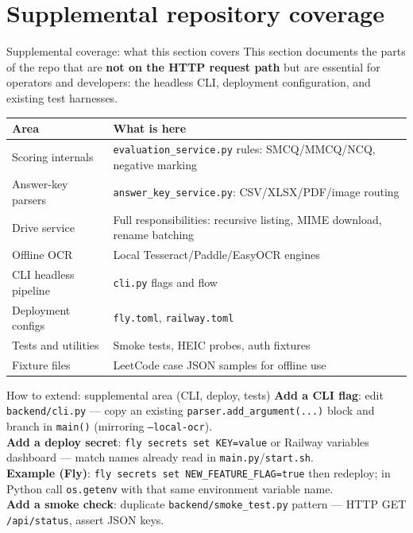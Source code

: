 \documentclass[aspectratio=169]{beamer}
\begin{document}
\section{Supplemental repository coverage}

\begin{frame}{Supplemental coverage: what this section covers}
  \small
  This section documents the parts of the repo that are \textbf{not on the HTTP request path} but are essential for operators and developers: the headless CLI, deployment configuration, and existing test harnesses.\\[0.4em]
  \begin{tabular}{@{}p{3.0cm}p{10.7cm}@{}}
    \toprule
    Area & What is here \\
    \midrule
    Scoring internals & \texttt{evaluation\_service.py} rules: SMCQ/MMCQ/NCQ, negative marking \\
    Answer-key parsers & \texttt{answer\_key\_service.py}: CSV/XLSX/PDF/image routing \\
    Drive service & Full responsibilities: recursive listing, MIME download, rename batching \\
    Offline OCR & Local Tesseract/Paddle/EasyOCR engines \\
    CLI headless pipeline & \texttt{cli.py} flags and flow \\
    Deployment configs & \texttt{fly.toml}, \texttt{railway.toml} \\
    Tests and utilities & Smoke tests, HEIC probes, auth fixtures \\
    Fixture files & LeetCode case JSON samples for offline use \\
    \bottomrule
  \end{tabular}
\end{frame}

\begin{frame}[fragile]{How to extend: supplemental area (CLI, deploy, tests)}
  \small
  \textbf{Add a CLI flag}: edit \texttt{backend/cli.py} --- copy an existing \texttt{parser.add\_argument(...)} block and branch in \texttt{main()} (mirroring \texttt{--local-ocr}).\\
  \textbf{Add a deploy secret}: \verb|fly secrets set KEY=value| or Railway variables dashboard --- match names already read in \texttt{main.py}/\texttt{start.sh}.\\
  \textbf{Example (Fly)}: \verb|fly secrets set NEW_FEATURE_FLAG=true| then redeploy; in Python call \texttt{os.getenv} with that same environment variable name.\\
  \textbf{Add a smoke check}: duplicate \texttt{backend/smoke\_test.py} pattern --- HTTP GET \texttt{/api/status}, assert JSON keys.
\end{frame}
\end{document}
